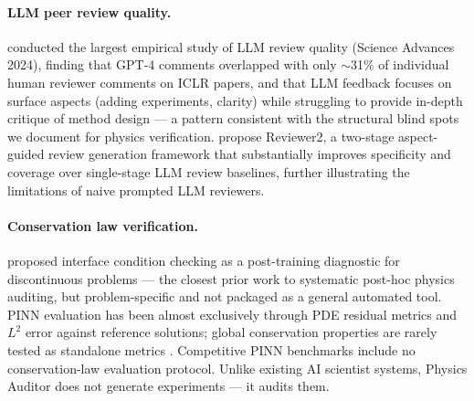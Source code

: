 \documentclass{article}
\begin{document}
\paragraph{LLM peer review quality.}
\citet{Liang2024LLMReview} conducted the largest empirical study of LLM
review quality (Science Advances 2024), finding that GPT-4 comments overlapped
with only $\sim$31\% of individual human reviewer comments on ICLR papers,
and that LLM feedback focuses on surface aspects (adding experiments, clarity)
while struggling to provide in-depth critique of method design --- a pattern
consistent with the structural blind spots we document for physics verification.
\citet{Gao2024ReviewerBias} propose Reviewer2, a two-stage aspect-guided
review generation framework that substantially improves specificity and
coverage over single-stage LLM review baselines, further illustrating the
limitations of naive prompted LLM reviewers.

\paragraph{Conservation law verification.}
\citet{Chen2021PhysicsAudit} proposed interface condition checking as a
post-training diagnostic for discontinuous problems --- the closest prior work
to systematic post-hoc physics auditing, but problem-specific and not packaged
as a general automated tool.
PINN evaluation has been almost exclusively through PDE residual metrics and
$L^2$ error against reference solutions; global conservation properties are
rarely tested as standalone metrics \citep{Yu2022GradientPathologies}.
Competitive PINN benchmarks \citep{Zeng2022Competitive} include no
conservation-law evaluation protocol.
Unlike existing AI scientist systems, Physics Auditor does not generate
experiments --- it audits them.
\end{document}
